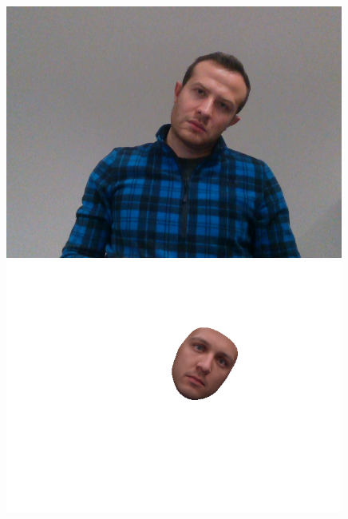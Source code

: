 \begin{figure}[h]
    \begin{minipage}{.325\textwidth}
      \centering
      \includegraphics[width=0.99\textwidth]{Figures/dataset/target/7.png}
    \end{minipage}
    \begin{minipage}{.325\textwidth}
      \centering
      \includegraphics[width=0.99\textwidth]{Figures/dataset/our/7.png}
    \end{minipage}
    \begin{minipage}{.325\textwidth}
      \centering

\end{minipage}
\end{figure}

